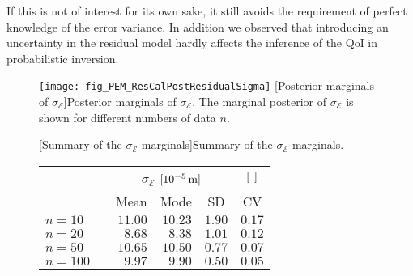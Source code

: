 If this is not of interest for its own sake, it still avoids the requirement of perfect knowledge of the error variance.
In addition we observed that introducing an uncertainty in the residual model hardly affects the inference of the QoI in probabilistic inversion.
\begin{figure}[ht]
  \centering
  \begin{minipage}[c]{0.52\textwidth}
    \centering
    \texttt{[image: fig\_PEM\_ResCalPostResidualSigma]}
    [Posterior marginals of \(\sigma_{\mathcal{E}}\)]{Posterior marginals of \(\sigma_{\mathcal{E}}\).
    The marginal posterior of \(\sigma_{\mathcal{E}}\) is shown for different numbers of data \(n\).
    }
    \label{fig:PEM:ResCal:Post:Mean}
  \end{minipage}%
  \hfill%
  \begin{minipage}[c]{0.46\textwidth}
    [Summary of the \(\sigma_{\mathcal{E}}\)-marginals]{Summary of the \(\sigma_{\mathcal{E}}\)-marginals.}
    \label{tab:PEM:ResCal:Summary}
    \centering
    \begin{tabular}{lrrrrr}
      \toprule
      & \phantom{} & \multicolumn{3}{c}{\(\sigma_{\mathcal{E}}\) \(\lbrack\unit[10^{-5}]{m}\rbrack\)} & \multicolumn{1}{c}{\(\lbrack \;\, \rbrack\)} \\
      \cmidrule{3-6}
      && \multicolumn{1}{c}{Mean} & \multicolumn{1}{c}{Mode} & \multicolumn{1}{c}{SD} & \multicolumn{1}{c}{CV} \\
      \midrule
      \(n=10\)  && \(11.00\) & \(10.23\) & \(1.90\) & \(0.17\) \\
      \(n=20\)  && \(8.68\)  & \(8.38\)  & \(1.01\) & \(0.12\) \\
      \(n=50\)  && \(10.65\) & \(10.50\) & \(0.77\) & \(0.07\) \\
      \(n=100\) && \(9.97\)  & \(9.90\)  & \(0.50\) & \(0.05\) \\
      \bottomrule
    \end{tabular}
  \end{minipage}%
\end{figure}